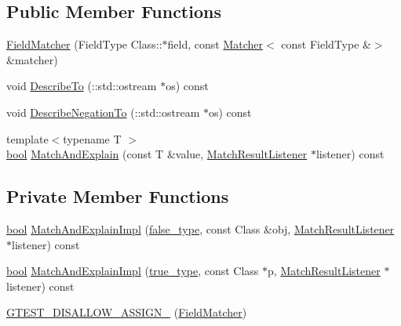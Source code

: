 \subsection*{Public Member Functions}
\begin{DoxyCompactItemize}
\item 
\hyperlink{classtesting_1_1internal_1_1FieldMatcher_a5d20aa34edd41eb898b1f8dd35d585f5}{Field\+Matcher} (Field\+Type Class\+::$\ast$field, const \hyperlink{classtesting_1_1Matcher}{Matcher}$<$ const Field\+Type \&$>$ \&matcher)
\item 
void \hyperlink{classtesting_1_1internal_1_1FieldMatcher_af0726e67962870bed9f3b184b3edb22e}{Describe\+To} (\+::std\+::ostream $\ast$os) const
\item 
void \hyperlink{classtesting_1_1internal_1_1FieldMatcher_a3d8eb433d6a765f8d59b3b07704c3d80}{Describe\+Negation\+To} (\+::std\+::ostream $\ast$os) const
\item 
{\footnotesize template$<$typename T $>$ }\\\hyperlink{classbool}{bool} \hyperlink{classtesting_1_1internal_1_1FieldMatcher_ac0cf950415d64026bc28eb84e6296f1b}{Match\+And\+Explain} (const T \&value, \hyperlink{classtesting_1_1MatchResultListener}{Match\+Result\+Listener} $\ast$listener) const
\end{DoxyCompactItemize}
\subsection*{Private Member Functions}
\begin{DoxyCompactItemize}
\item 
\hyperlink{classbool}{bool} \hyperlink{classtesting_1_1internal_1_1FieldMatcher_a3ac8072e68a33f78531d7b1eff96810c}{Match\+And\+Explain\+Impl} (\hyperlink{namespacetesting_1_1internal_abb1d0789f19bdde21affccbd1078b525}{false\+\_\+type}, const Class \&obj, \hyperlink{classtesting_1_1MatchResultListener}{Match\+Result\+Listener} $\ast$listener) const
\item 
\hyperlink{classbool}{bool} \hyperlink{classtesting_1_1internal_1_1FieldMatcher_aade72eefad16c8e6f8db59082b62f3aa}{Match\+And\+Explain\+Impl} (\hyperlink{namespacetesting_1_1internal_a62f917c3424d8841de9b49b5ec28edb4}{true\+\_\+type}, const Class $\ast$p, \hyperlink{classtesting_1_1MatchResultListener}{Match\+Result\+Listener} $\ast$listener) const
\item 
\hyperlink{classtesting_1_1internal_1_1FieldMatcher_a54bedc88dafc15ebd6d681f93ad5a661}{G\+T\+E\+S\+T\+\_\+\+D\+I\+S\+A\+L\+L\+O\+W\+\_\+\+A\+S\+S\+I\+G\+N\+\_\+} (\hyperlink{classtesting_1_1internal_1_1FieldMatcher}{Field\+Matcher})
\end{DoxyCompactItemize}
